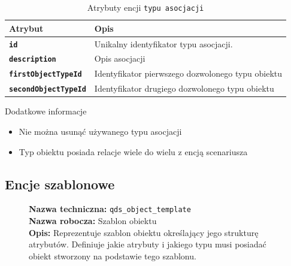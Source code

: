 \begin{table}[H]
    \centering
    \renewcommand{\arraystretch}{1.6}
    \begin{tabular}{|>{\bfseries}l|p{}|}
        \hline
        \rowcolor[HTML]{EFEFEF} \textbf{Atrybut} & \textbf{Opis} \\
        \hline
        \texttt{id} & Unikalny identyfikator typu asocjacji. \\
        \hline
        \texttt{description} & Opis asocjacji \\
        \hline
        \texttt{firstObjectTypeId} & Identyfikator pierwszego dozwolonego typu obiektu \\
        \hline
        \texttt{secondObjectTypeId} & Identyfikator drugiego dozwolonego typu obiektu \\
        \hline
    \end{tabular}
    \caption{Atrybuty encji \texttt{typu asocjacji}}
\end{table}

Dodatkowe informacje
\begin{itemize}
    \item Nie można usunąć używanego typu asocjacji
    \item Typ obiektu posiada relacje wiele do wielu z encją scenariusza 
\end{itemize}

\subsection{Encje szablonowe}

\begin{figure}[H]
    \centering
    \begin{minipage}{0.8\textwidth} 
        \begin{framed}
            \noindent\textbf{\large Nazwa techniczna:} \texttt{qds\_object\_template} \\
            \textbf{\large Nazwa robocza:} Szablon obiektu \\
            \textbf{\large Opis:} Reprezentuje szablon obiektu określający jego strukturę atrybutów.
            Definiuje jakie atrybuty i jakiego typu musi posiadać obiekt stworzony na podstawie tego szablonu.
        \end{framed}
    \end{minipage}
\end{figure}

